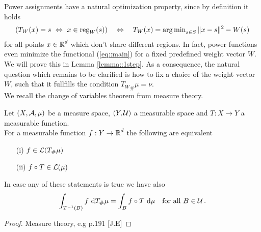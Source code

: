 \documentclass[
     12pt,         %
     a4paper,      %
     BCOR=10mm,     %
     DIV=14,        %
     ]{scrreprt}
\begin{document}
    Power assignments have a natural optimization property, since by definition it holds 
    \begin{align}
        ( T_W(x) = s \  \Leftrightarrow \ x\in \operatorname{reg}_W(s) ) \quad \Leftrightarrow \quad T_W(x) = \operatorname{arg\,min}_{s\in S} \|x-s\|^2 - W(s) \label{eq::minimalityPower}
    \end{align}
    for all points $x \in \operatorname{\mathbb{R}}^d$ which don't share different regions. In fact, power functions even minimize the functional (\ref{eq::main}) for a fixed predefined weight vector $W$.
    We will prove this in Lemma \ref{lemma::1step}. As a consequence, the natural question which remains to be clarified is how to fix a choice of the weight vector $W$, such that it fullfills the condition ${T_{W}}_{\#}\mu = \nu$.\\[8pt]
    \indent We recall the change of variables theorem from measure theory. 
    \begin{thm*}
         Let $(X, \operatorname{\mathcal{A}}, \mu)$ be a measure space, $(Y, \operatorname{\mathcal{U}})$ a measurable space and $T: X \to Y $ a measurable function.\\
         For a measurable function $f : Y \to \operatorname{\mathbb{R}}^d $ the following are equivalent
         \begin{itemize}
             \item[(i)] $f\in \operatorname{\mathcal{L}}(T_\#\mu)$ 
             \item[(ii)]  $f \circ T \in \operatorname{\mathcal{L}}(\mu) $ 
        \end{itemize}         
        In case any of these statements is true we have also
         \begin{align} \label{eq::transformel}
             \int_{T^{-1}(B)} f \ {\operatorname{{\mathrm{d}}}} T_{\#}\mu = \int_{B} f \circ T \ {\operatorname{{\mathrm{d}}}} \mu \quad \text{for all } B\in \operatorname{\mathcal{U}}.
         \end{align}
    \end{thm*}
    \begin{proof}[Proof]
    Measure theory, e.g p.$191$ [J.E]
    \end{proof}
    
\end{document}
